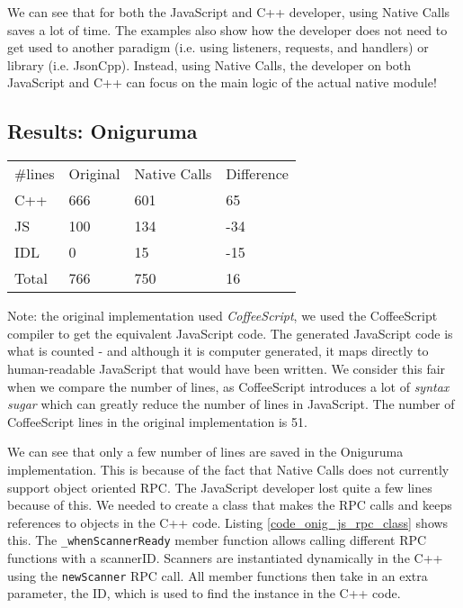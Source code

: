 We can see that for both the JavaScript and C++ developer, using Native Calls saves a lot of time. The examples also show how the developer does not need to get used to another paradigm (i.e. using listeners, requests, and handlers) or library (i.e. JsonCpp). Instead, using Native Calls, the developer on both JavaScript and C++ can focus on the main logic of the actual native module!


\subsection{Results: Oniguruma} %
\label{sub:evaluation_usability_oniguruma}
\begin{table}[h]
\begin{tabular}{llll}
\#lines                    & Original & Native Calls & Difference \\ \cline{2-4} 
\multicolumn{1}{l|}{C++}   & 666      & 601          &  65        \\
\multicolumn{1}{l|}{JS}    & 100      & 134          &  -34       \\
\multicolumn{1}{l|}{IDL}   & 0        & 15           &  -15       \\
\multicolumn{1}{l|}{Total} & 766      & 750          &  16
\end{tabular}
\end{table}

Note: the original implementation used \emph{CoffeeScript}, we used the CoffeeScript compiler to get the equivalent JavaScript code. The generated JavaScript code is what is counted - and although it is computer generated, it maps directly to human-readable JavaScript that would have been written. We consider this fair when we compare the number of lines, as CoffeeScript introduces a lot of \emph{syntax sugar} which can greatly reduce the number of lines in JavaScript. The number of CoffeeScript lines in the original implementation is 51.

We can see that only a few number of lines are saved in the Oniguruma implementation. This is because of the fact that Native Calls does not currently support object oriented RPC. The JavaScript developer lost quite a few lines because of this. We needed to create a class that makes the RPC calls and keeps references to objects in the C++ code. Listing \ref{code_onig_js_rpc_class} shows this. The \lstinline{_whenScannerReady} member function allows calling different RPC functions with a scannerID. Scanners are instantiated dynamically in the C++ using the \lstinline{newScanner} RPC call. All member functions then take in an extra parameter, the ID, which is used to find the instance in the C++ code.

